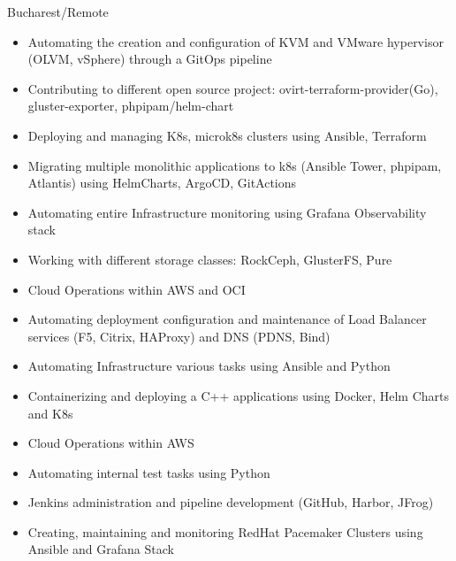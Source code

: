 \documentclass[10pt,a4paper,ragged2e,withhyper]{altacv}
\begin{document}


\makecvheader


\begin{paracol}{2}

{Bucharest/Remote}
\begin{itemize}
\item Automating the creation and configuration of KVM and VMware hypervisor (OLVM, vSphere) through a GitOps pipeline
\item Contributing to different open source project: ovirt-terraform-provider(Go), gluster-exporter, phpipam/helm-chart
\item Deploying and managing K8s, microk8s clusters using Ansible, Terraform 
\item Migrating multiple monolithic applications to k8s (Ansible Tower, phpipam, Atlantis) using HelmCharts, ArgoCD, GitActions
\item Automating entire Infrastructure monitoring using Grafana \newline Observability stack
\item Working with different storage classes: RockCeph, GlusterFS, Pure
\item Cloud Operations within AWS and OCI
\item Automating deployment configuration and maintenance of Load Balancer services (F5, Citrix, HAProxy) and DNS (PDNS, Bind)
\item Automating Infrastructure various tasks using Ansible and Python
\end{itemize}
\divider
{}
\begin{itemize}
\item Containerizing and deploying a C++ applications using Docker, Helm Charts and K8s
\item Cloud Operations within AWS
\item Automating internal test tasks using Python
\item Jenkins administration and pipeline development (GitHub, \newline Harbor, JFrog)
\item Creating, maintaining and monitoring RedHat Pacemaker \newline Clusters using Ansible and Grafana Stack
\end{itemize}


\end{paracol}
\end{document}
